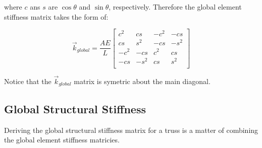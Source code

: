 where $c$ ans $s$ are $\cos\theta$ and $\sin\theta$, respectively. Therefore the global element stiffness matrix takes the form of:

\begin{equation}
\vec{k}_{global}
=
\frac{AE}{L}
	\begin{bmatrix}
  	c^2 & cs & -c^2 & -cs\\
  	cs & s^2 & -cs & -s^2\\
  	-c^2 & -cs & c^2 & cs\\
  	-cs & -s^2 & cs & s^2\\
	\end{bmatrix}
\end{equation}

Notice that the $\vec{k}_{global}$ matrix is  symetric about the main diagonal. 

\subsection{Global Structural Stiffness}

Deriving the global structural stiffness matrix for a truss is a matter of combining the global element stiffness matricies.


